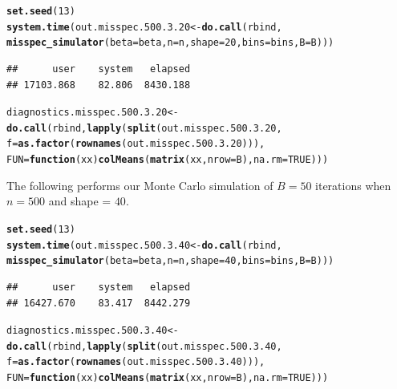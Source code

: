 \documentclass[11pt]{article}\usepackage[]{graphicx}\usepackage[]{color}
\makeatletter
\newcommand{\hlnum}[1]{\textcolor[rgb]{0.686,0.059,0.569}{#1}}%
\newcommand{\hlstd}[1]{\textcolor[rgb]{0.345,0.345,0.345}{#1}}%
\newcommand{\hlkwa}[1]{\textcolor[rgb]{0.161,0.373,0.58}{\textbf{#1}}}%
\newcommand{\hlkwb}[1]{\textcolor[rgb]{0.69,0.353,0.396}{#1}}%
\newcommand{\hlkwc}[1]{\textcolor[rgb]{0.333,0.667,0.333}{#1}}%
\newcommand{\hlkwd}[1]{\textcolor[rgb]{0.737,0.353,0.396}{\textbf{#1}}}%
\newenvironment{kframe}{%
 \def\at@end@of@kframe{}%
 \ifinner\ifhmode%
  \def\at@end@of@kframe{\end{minipage}}%
  \begin{minipage}{\columnwidth}%
 \fi\fi%
 \def\FrameCommand##1{\hskip\@totalleftmargin \hskip-\fboxsep
 \colorbox{shadecolor}{##1}\hskip-\fboxsep
     \hskip-\linewidth \hskip-\@totalleftmargin \hskip\columnwidth}%
 \MakeFramed {\advance\hsize-\width
   \@totalleftmargin\z@ \linewidth\hsize
   \@setminipage}}%
 {\par\unskip\endMakeFramed%
 \at@end@of@kframe}
\newenvironment{knitrout}{}{} %
\makeatother
\begin{document}
\begin{knitrout}
\color{fgcolor}\begin{kframe}
\begin{alltt}
\hlkwd{set.seed}\hlstd{(}\hlnum{13}\hlstd{)}
\hlkwd{system.time}\hlstd{(out.misspec.500.3.20} \hlkwb{<-} \hlkwd{do.call}\hlstd{(rbind,}
  \hlkwd{misspec_simulator}\hlstd{(}\hlkwc{beta} \hlstd{= beta,} \hlkwc{n} \hlstd{= n,} \hlkwc{shape} \hlstd{=} \hlnum{20}\hlstd{,} \hlkwc{bins} \hlstd{= bins,} \hlkwc{B} \hlstd{= B)))}
\end{alltt}
\begin{verbatim}
##      user    system   elapsed 
## 17103.868    82.806  8430.188
\end{verbatim}
\begin{alltt}
\hlstd{diagnostics.misspec.500.3.20} \hlkwb{<-} \hlkwd{do.call}\hlstd{(rbind,} \hlkwd{lapply}\hlstd{(}\hlkwd{split}\hlstd{(out.misspec.500.3.20,}
  \hlkwc{f} \hlstd{=} \hlkwd{as.factor}\hlstd{(}\hlkwd{rownames}\hlstd{(out.misspec.500.3.20))),}
  \hlkwc{FUN} \hlstd{=} \hlkwa{function}\hlstd{(}\hlkwc{xx}\hlstd{)} \hlkwd{colMeans}\hlstd{(}\hlkwd{matrix}\hlstd{(xx,} \hlkwc{nrow} \hlstd{= B),} \hlkwc{na.rm} \hlstd{=} \hlnum{TRUE}\hlstd{)))}
\end{alltt}
\end{kframe}
\end{knitrout}


The following performs our Monte Carlo simulation of $B = 50$ iterations 
when $n = 500$ and shape = $40$.

\begin{knitrout}
\color{fgcolor}\begin{kframe}
\begin{alltt}
\hlkwd{set.seed}\hlstd{(}\hlnum{13}\hlstd{)}
\hlkwd{system.time}\hlstd{(out.misspec.500.3.40} \hlkwb{<-} \hlkwd{do.call}\hlstd{(rbind,}
  \hlkwd{misspec_simulator}\hlstd{(}\hlkwc{beta} \hlstd{= beta,} \hlkwc{n} \hlstd{= n,} \hlkwc{shape} \hlstd{=} \hlnum{40}\hlstd{,} \hlkwc{bins} \hlstd{= bins,} \hlkwc{B} \hlstd{= B)))}
\end{alltt}
\begin{verbatim}
##      user    system   elapsed 
## 16427.670    83.417  8442.279
\end{verbatim}
\begin{alltt}
\hlstd{diagnostics.misspec.500.3.40} \hlkwb{<-} \hlkwd{do.call}\hlstd{(rbind,} \hlkwd{lapply}\hlstd{(}\hlkwd{split}\hlstd{(out.misspec.500.3.40,}
  \hlkwc{f} \hlstd{=} \hlkwd{as.factor}\hlstd{(}\hlkwd{rownames}\hlstd{(out.misspec.500.3.40))),}
  \hlkwc{FUN} \hlstd{=} \hlkwa{function}\hlstd{(}\hlkwc{xx}\hlstd{)} \hlkwd{colMeans}\hlstd{(}\hlkwd{matrix}\hlstd{(xx,} \hlkwc{nrow} \hlstd{= B),} \hlkwc{na.rm} \hlstd{=} \hlnum{TRUE}\hlstd{)))}
\end{alltt}
\end{kframe}
\end{knitrout}
\end{document}
